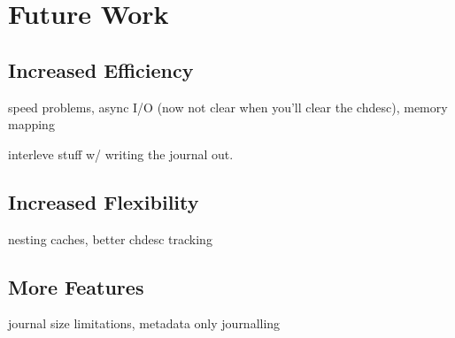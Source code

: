 \section{Future Work}
\label{sec:future}

\subsection{Increased Efficiency}
speed problems, async I/O (now not clear when you'll clear the
chdesc), memory mapping

interleve stuff w/ writing the journal out.

\subsection{Increased Flexibility}
nesting caches, better chdesc tracking

\subsection{More Features}
journal size limitations, metadata only journalling
